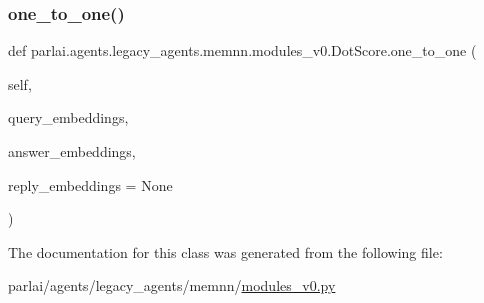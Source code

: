 \mbox{\label{classparlai_1_1agents_1_1legacy__agents_1_1memnn_1_1modules__v0_1_1DotScore_acf84cd9ea66c02103aae3b3ddb78c59e}} 
\subsubsection{\texorpdfstring{one\+\_\+to\+\_\+one()}{one\_to\_one()}}
{\footnotesize\ttfamily def parlai.\+agents.\+legacy\+\_\+agents.\+memnn.\+modules\+\_\+v0.\+Dot\+Score.\+one\+\_\+to\+\_\+one (\begin{DoxyParamCaption}\item[{}]{self,  }\item[{}]{query\+\_\+embeddings,  }\item[{}]{answer\+\_\+embeddings,  }\item[{}]{reply\+\_\+embeddings = {\ttfamily None} }\end{DoxyParamCaption})}



The documentation for this class was generated from the following file\+:\begin{DoxyCompactItemize}
\item 
parlai/agents/legacy\+\_\+agents/memnn/\hyperlink{memnn_2modules__v0_8py}{modules\+\_\+v0.\+py}\end{DoxyCompactItemize}

